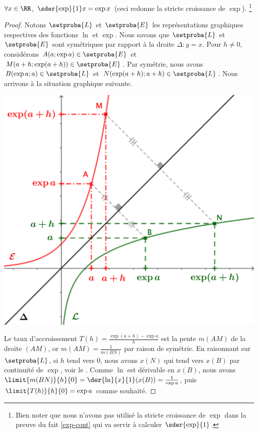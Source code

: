 

\begin{fact}
	$\forall x \in \RR$,
	$\sder{\exp}{1} x = \exp x$
	(ceci redonne la stricte croissance de $\exp$).%
	\footnote{
		Bien noter que nous n'avons pas utilisé la stricte croissance de $\exp$ dans la preuve du fait \ref{exp-cont} qui va servir à calculer $\sder{\exp}{1}$.
	}
\end{fact}


\begin{proof}
	Notons $\setproba{L}$ et $\setproba{E}$ les représentations graphiques respectives des fonctions $\ln$ et $\exp$.
	Nous savons que $\setproba{L}$ et $\setproba{E}$ sont symétriques par rapport à la droite $\Delta: y = x$.
	Pour $h \neq 0$, considérons
	$A(a ; \exp a) \in \setproba{E}$ et $M(a+h ; \exp(a+h)) \in \setproba{E}$.
	Par symétrie, nous avons
	$B(\exp a ; a) \in \setproba{L}$ et $N(\exp(a+h) ; a+h) \in \setproba{L}$.
	Nous arrivons à la situation graphique suivante.

	\begin{center}
		\includegraphics[scale=.85]{content/exp/eq-diff.png}
	\end{center}

	Le taux d'accroissement $T(h) = \frac{\exp(a+h) - \exp a}{h}$ est la pente $m(AM)$ de la droite $(AM)$, or $m(AM) = \frac{1}{m(BN)}$ par raison de symétrie.
	En raisonnant sur $\setproba{L}$, si $h$ tend vers $0$, nous avons $x(N)$ qui tend vers $x(B)$ par continuité de $\exp$, voir le .
	Comme $\ln$ est dérivable en $x(B)$, nous avons
	$\limit{m(BN)}{h}{0} = \der{\ln}{x}{1}(x(B)) = \frac{1}{\exp a}$,
	puis
	$\limit{T(h)}{h}{0} = \exp a$
	comme souhaité.
\end{proof}
